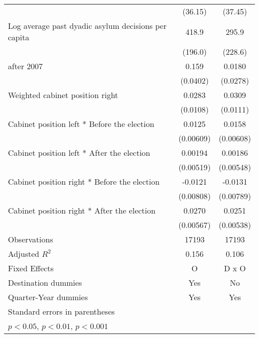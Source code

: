 \begin{table}[htbp]
\begin{tabular}{l*{2}{c}}
                    &     (36.15)         &     (37.45)         \\
[1em]
Log average past dyadic asylum decisions per capita&       418.9\sym{*}  &       295.9         \\
                    &     (196.0)         &     (228.6)         \\
[1em]
after 2007          &       0.159\sym{***}&      0.0180         \\
                    &    (0.0402)         &    (0.0278)         \\
[1em]
Weighted cabinet position right&      0.0283\sym{*}  &      0.0309\sym{**} \\
                    &    (0.0108)         &    (0.0111)         \\
[1em]
Cabinet position left * Before the election&      0.0125\sym{*}  &      0.0158\sym{*}  \\
                    &   (0.00609)         &   (0.00608)         \\
[1em]
Cabinet position left * After the election&     0.00194         &     0.00186         \\
                    &   (0.00519)         &   (0.00548)         \\
[1em]
Cabinet position right * Before the election&     -0.0121         &     -0.0131         \\
                    &   (0.00808)         &   (0.00789)         \\
[1em]
Cabinet position right * After the election&      0.0270\sym{***}&      0.0251\sym{***}\\
                    &   (0.00567)         &   (0.00538)         \\
\hline
Observations        &       17193         &       17193         \\
Adjusted \(R^{2}\)  &       0.156         &       0.106         \\
Fixed Effects       &           O         &       D x O         \\
Destination dummies &         Yes         &          No         \\
Quarter-Year dummies&         Yes         &         Yes         \\
\hline\hline
\multicolumn{3}{l}{\footnotesize Standard errors in parentheses}\\
\multicolumn{3}{l}{\footnotesize \sym{*} \(p<0.05\), \sym{**} \(p<0.01\), \sym{***} \(p<0.001\)}\\
\end{tabular}
\end{table}
